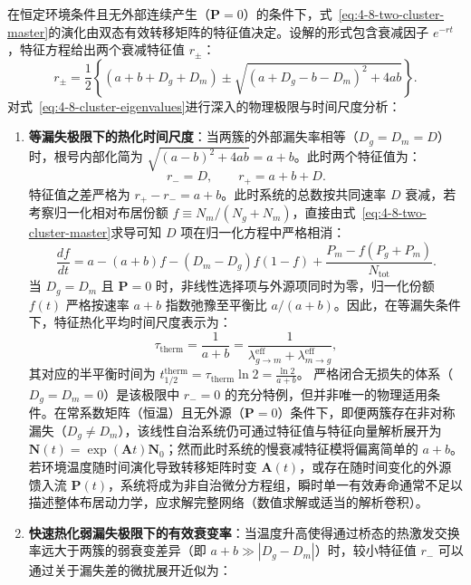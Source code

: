 在恒定环境条件且无外部连续产生（$\mathbf{P} = 0$）的条件下，式~\eqref{eq:4-8-two-cluster-master}的演化由双态有效转移矩阵的特征值决定。设解的形式包含衰减因子 $e^{-r t}$，特征方程给出两个衰减特征值 $r_\pm$：
\begin{equation}\label{eq:4-8-cluster-eigenvalues}
r_\pm = \frac{1}{2}\left\{ (a + b + D_g + D_m) \pm \sqrt{(a + D_g - b - D_m)^2 + 4ab} \right\}.
\end{equation}
对式~\eqref{eq:4-8-cluster-eigenvalues}进行深入的物理极限与时间尺度分析：
\begin{enumerate}
\item \textbf{等漏失极限下的热化时间尺度}：当两簇的外部漏失率相等（$D_g = D_m = D$）时，根号内部化简为 $\sqrt{(a-b)^2 + 4ab} = a+b$。此时两个特征值为：
\begin{equation}\label{eq:4-8-lossless-limits}
r_- = D, \qquad r_+ = a + b + D.
\end{equation}
特征值之差严格为 $r_+ - r_- = a + b$。此时系统的总数按共同速率 $D$ 衰减，若考察归一化相对布居份额 $f \equiv N_m / (N_g + N_m)$，直接由式~\eqref{eq:4-8-two-cluster-master}求导可知 $D$ 项在归一化方程中严格相消：
\begin{equation}\label{eq:4-8-normalized-fraction-ode}
\frac{df}{dt} = a - (a + b)f - (D_m - D_g)f(1 - f) + \frac{P_m - f(P_g + P_m)}{N_{\mathrm{tot}}}.
\end{equation}
当 $D_g = D_m$ 且 $\mathbf{P} = 0$ 时，非线性选择项与外源项同时为零，归一化份额 $f(t)$ 严格按速率 $a + b$ 指数弛豫至平衡比 $a/(a+b)$。因此，在等漏失条件下，特征热化平均时间尺度表示为：
\begin{equation}\label{eq:4-8-therm-timescale}
\tau_{\mathrm{therm}} = \frac{1}{a + b} = \frac{1}{\lambda_{g \to m}^{\mathrm{eff}} + \lambda_{m \to g}^{\mathrm{eff}}},
\end{equation}
其对应的半平衡时间为 $t_{1/2}^{\mathrm{therm}} = \tau_{\mathrm{therm}} \ln 2 = \frac{\ln 2}{a + b}$。
严格闭合无损失的体系（$D_g = D_m = 0$）是该极限中 $r_- = 0$ 的充分特例，但并非唯一的物理适用条件。在常系数矩阵（恒温）且无外源（$\mathbf{P} = 0$）条件下，即便两簇存在非对称漏失（$D_g \ne D_m$），该线性自治系统仍可通过特征值与特征向量解析展开为 $\mathbf{N}(t) = \exp(\mathbf{A}t)\mathbf{N}_0$；然而此时系统的慢衰减特征模将偏离简单的 $a+b$。若环境温度随时间演化导致转移矩阵时变 $\mathbf{A}(t)$，或存在随时间变化的外源馈入流 $\mathbf{P}(t)$，系统将成为非自治微分方程组，瞬时单一有效寿命通常不足以描述整体布居动力学，应求解完整网络（数值求解或适当的解析卷积）。
\item \textbf{快速热化弱漏失极限下的有效衰变率}：当温度升高使得通过桥态的热激发交换率远大于两簇的弱衰变差异（即 $a + b \gg |D_g - D_m|$）时，较小特征值 $r_-$ 可以通过关于漏失差的微扰展开近似为：

\end{enumerate}
